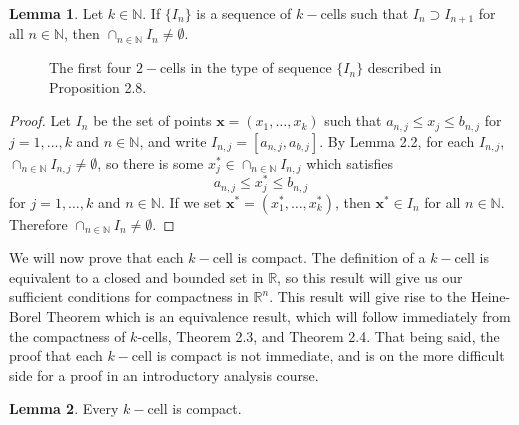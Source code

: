 \documentclass{article}
\newcommand{\N}{\mathbb{N}}
\newcommand{\R}{\mathbb{R}}
\newcommand{\x}{\mathbf{x}}
\theoremstyle{definition}
\newtheorem{lemma}{Lemma}[section]
\begin{document}
\begin{lemma}
	Let $ k\in\N $. If $ \{I_n\} $ is a sequence of $ k- $cells such that $ I_n\supset I_{n+1} $ for all $ n\in\N $, then $ \cap_{n\in\N} I_n\neq\emptyset $. 
\end{lemma}
		\begin{figure}[h]
	\centering
	\caption{The first four $ 2- $cells in the type of sequence $ \{I_n\} $ described in Proposition 2.8.}
\end{figure}
\begin{proof}
	Let $ I_n $ be the set of points $ \x=(x_1,\ldots,x_k) $ such that $ a_{n,j}\le x_j\le b_{n,j} $ for $ j=1,\ldots, k $ and $ n\in\N $, and write $ I_{n,j}=[a_{n,j},a_{b,j}] $. By Lemma 2.2, for each $ I_{n,j} $, $ \cap_{n\in\N}I_{n,j}\neq\emptyset $, so there is some $ x_j^*\in\cap_{n\in\N} I_{n,j} $ which satisfies $$ a_{n,j}\le x_j^*\le b_{n,j}$$ for $j=1,\ldots, k $ and $ n\in\N $. If we set $ \x^*=(x_1^*,\ldots,x_k^*) $, then $ \x^*\in I_n $ for all $ n\in\N $. Therefore  $ \cap_{n\in\N} I_n\neq\emptyset $. 
\end{proof}
We will now prove that each $ k -$cell is compact. The definition of a $ k -$cell is equivalent to a closed and bounded set in $ \R $, so this result will give us our sufficient conditions for compactness in $ \R^n $. This result will give rise to the Heine-Borel Theorem which is an equivalence result, which will follow immediately from the compactness of $ k $-cells, Theorem 2.3, and Theorem 2.4. That being said, the proof that each $ k -$cell is compact is not immediate, and is on the more difficult side for a proof in an introductory analysis course.    
\begin{lemma}
	Every $ k -$cell is compact. 
\end{lemma}
\end{document}
